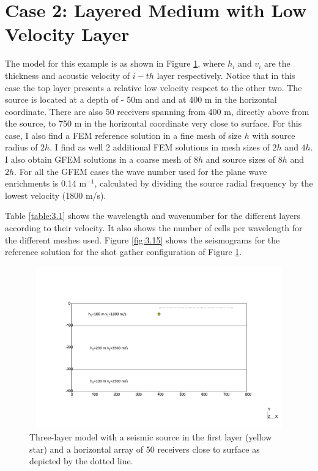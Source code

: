 \section{Case 2: Layered Medium with Low Velocity Layer}
 The model for this example is as shown in Figure \ref{fig:3.14}, where $h_i$  and $v_i$ are the thickness and acoustic velocity of $i-th$ layer respectively. Notice that in this case the top layer presents a relative low velocity respect to the other two.  The source is located at a depth of - 50m and and at 400 m in the horizontal coordinate. There are also 50 receivers spanning from 400 m, directly above from the source, to 750 m in the horizontal coordinate very close to surface. For this case, I also find a FEM reference solution in a fine mesh of size $h$ with source radius of $2h$. I find as well 2 additional FEM solutions in mesh sizes of $2h$ and $4h$. I also obtain GFEM solutions in a coarse mesh of $8h$ and source sizes of  $8h$ and $2h$.  For all the GFEM cases the wave number used for the plane wave enrichments is 0.14 m$^{-1}$, calculated by dividing the source radial frequency by the lowest velocity (1800 m/s).
 
 Table \ref{table:3.1} shows the wavelength and wavenumber for the different layers according to their velocity. It also shows the number of cells per wavelength for the different meshes used.   
 Figure \ref{fig:3.15} shows the seismograms for the reference solution for the shot gather configuration of Figure \ref{fig:3.14}.
 
 \begin{figure}[h!]
	\centering
	\includegraphics[width=14cm, height=7cm]{Thesis_Edith/figures/layered_model/layer_source.pdf}
	\caption{Three-layer model  with a seismic source in the first layer (yellow star) and a horizontal array of 50 receivers close to surface as depicted by the dotted line.}
	\label{fig:3.14}
\end{figure}


